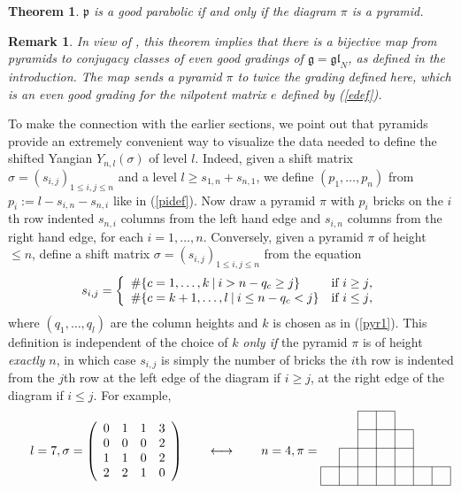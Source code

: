 \documentclass[twoside,12pt,reqno]{amsart}
\newtheorem{Theorem}[Proposition]{Theorem}
\newtheorem{Remark}[Proposition]{Remark}
\begin{document}
\begin{Theorem}\label{pyrclass}
$\mathfrak{p}$ is a good parabolic if and only if the
diagram $\pi$ is a pyramid.
\end{Theorem}

\begin{Remark}\rm
In view of \cite[Theorem 2.1]{EK}, this theorem
implies that there is a bijective map
from pyramids to
conjugacy classes of
even good gradings of $\mathfrak{g} = \mathfrak{gl}_N$,
as defined in the introduction.
The map sends a pyramid
$\pi$ to twice the grading defined here, which is an even good
grading
for the nilpotent matrix $e$ defined by (\ref{edef}).
\end{Remark}

To make the connection with the earlier sections,
we point out that pyramids provide an extremely
convenient way to visualize the data needed to define the
shifted Yangian $Y_{n,l}(\sigma)$ of level $l$.
Indeed, given a shift matrix 
$\sigma = (s_{i,j})_{1 \leq i,j \leq n}$
and a level $l \geq s_{1,n}+s_{n,1}$, 
we define 
$(p_1,\dots,p_n)$ from $p_i := l-s_{i,n}-s_{n,i}$
like in (\ref{pidef}). Now draw a pyramid $\pi$
with $p_i$ bricks on the $i$th row indented
$s_{n,i}$ columns from the left hand edge and
$s_{i,n}$ columns from the right hand edge,
for each $i=1,\dots,n$.
Conversely, given a pyramid $\pi$ of height $\leq n$,
define a shift matrix $\sigma = (s_{i,j})_{1 \leq i,j \leq n}$ 
from the equation
\begin{equation}\label{pyr3}
s_{i,j} = \left\{
\begin{array}{ll}
\#\{c=1,\dots,k\:|\:
i >
n-q_c \geq j\}&\hbox{if $i \geq j$,}\\
\#\{c=k+1,\dots,l\:|\:
i \leq
n-q_c < j\}&\hbox{if $i \leq j$,}
\end{array}\right.
\end{equation}
where 
$(q_1,\dots, q_l)$ are the column heights and
$k$ is chosen as in (\ref{pyr1}).
This definition is independent of the choice of $k$ 
{\em only if} the pyramid $\pi$ is of height {\em exactly} $n$, 
in which case 
$s_{i,j}$ is simply the number of bricks the $i$th row is indented
from the $j$th row at the left edge of the diagram if $i \geq j$,
at the right edge  of the diagram if $i \leq j$.
For example, 
$$
l=7,
\sigma = \left(\begin{array}{llll}
0&1&1&3\\
0&0&0&2\\
1&1&0&2\\
2&2&1&0
\end{array}\right)
\qquad\longleftrightarrow \qquad
n=4,\pi = 
{\begin{picture}(90, 35)%
\put(0,-25){\line(1,0){105}}
\put(0,-10){\line(1,0){105}}
\put(15,5){\line(1,0){60}}
\put(30,20){\line(1,0){45}}
\put(30,35){\line(1,0){30}}
\put(0,-25){\line(0,1){15}}
\put(15,-25){\line(0,1){30}}
\put(30,-25){\line(0,1){60}}
\put(45,-25){\line(0,1){60}}
\put(60,-25){\line(0,1){60}}
\put(75,-25){\line(0,1){45}}
\put(90,-25){\line(0,1){15}}
\put(105,-25){\line(0,1){15}}
\end{picture}}
$$
\end{document}
